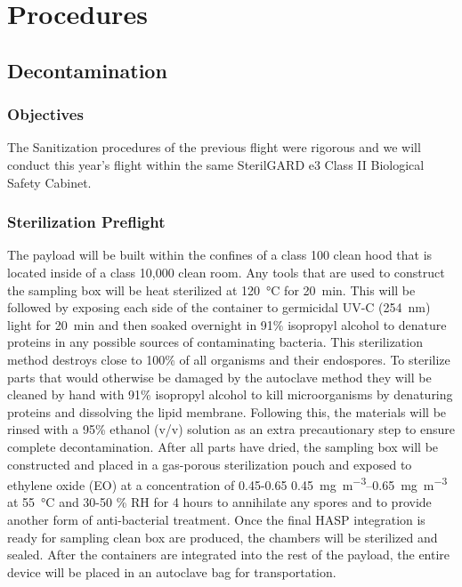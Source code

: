 \section{Procedures}
\label{sec:Procedures}

\subsection{Decontamination}
\label{subsec:Decontamination}

\subsubsection{Objectives}
The Sanitization procedures of the previous flight were rigorous and we will conduct this year's flight within the same SterilGARD e3 Class II Biological Safety Cabinet. 

\subsubsection{Sterilization Preflight}
The payload will be built within the confines of a class 100 clean hood that is located inside of a class 10,000 clean room. Any tools that are used to construct the sampling box will be heat sterilized at \SI{120}{\celsius} for \SI{20}{\minute}. This will be followed by exposing each side of the container to germicidal UV-C (\SI{254}{\nano\meter}) light for \SI{20}{\minute} and then soaked overnight in 91\% isopropyl alcohol to denature proteins in any possible sources of contaminating bacteria. This sterilization method destroys close to 100\% of all organisms and their endospores. To sterilize parts that would otherwise be damaged by the autoclave method they will be cleaned by hand with 91\% isopropyl alcohol to kill microorganisms by denaturing proteins and dissolving the lipid membrane. Following this, the materials will be rinsed with a 95\% ethanol (v/v) solution as an extra precautionary step to ensure complete decontamination. After all parts have dried, the sampling box will be constructed and placed in a gas-porous sterilization pouch and exposed to ethylene oxide (EO) at a concentration of 0.45-0.65 \SIrange{0.45}{0.65}{\milli\gram\per\meter\cubed} at \SI{55}{\celsius} and 30-50 \% RH for \num{4} hours to annihilate any spores and to provide another form of anti-bacterial treatment.  Once the final HASP integration is ready for sampling clean box are produced, the chambers will be sterilized and sealed. After the containers are integrated into the rest of the payload, the entire device will be placed in an autoclave bag for transportation.

